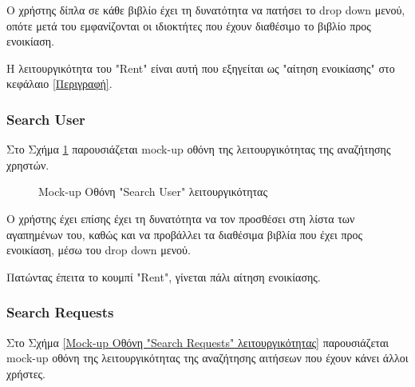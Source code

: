 \documentclass[12pt,a4paper]{article}
\begin{document}
Ο χρήστης δίπλα σε κάθε βιβλίο έχει τη δυνατότητα να πατήσει το drop down μενού, οπότε μετά του εμφανίζονται οι ιδιοκτήτες που έχουν διαθέσιμο το βιβλίο προς ενοικίαση.

Η λειτουργικότητα του "Rent" είναι αυτή που εξηγείται ως "αίτηση ενοικίασης" στο κεφάλαιο \ref{Περιγραφή}.

\subsubsection{Search User}

Στο Σχήμα \ref{Mock-up Οθόνη "Search User" λειτουργικότητας} παρουσιάζεται mock-up οθόνη της λειτουργικότητας της αναζήτησης χρηστών.

\begin{figure}[H]
	\caption{Mock-up Οθόνη "Search User" λειτουργικότητας}
	\label{Mock-up Οθόνη "Search User" λειτουργικότητας}
\end{figure}

Ο χρήστης έχει επίσης έχει τη δυνατότητα να τον προσθέσει στη λίστα των αγαπημένων του, καθώς και να προβάλλει τα διαθέσιμα βιβλία που έχει προς ενοικίαση, μέσω του drop down μενού. 

Πατώντας έπειτα το κουμπί "Rent", γίνεται πάλι αίτηση ενοικίασης.

\subsubsection{Search Requests}

Στο Σχήμα \ref{Mock-up Οθόνη "Search Requests" λειτουργικότητας} παρουσιάζεται mock-up οθόνη της λειτουργικότητας της αναζήτησης αιτήσεων που έχουν κάνει άλλοι χρήστες.
\end{document}
